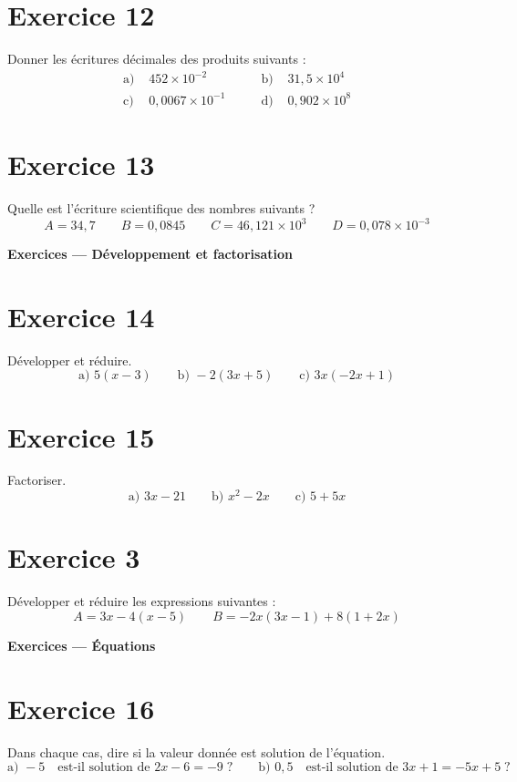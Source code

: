 \documentclass[a4paper,11pt]{article}
\begin{document}
\section*{Exercice 12}
Donner les écritures décimales des produits suivants :
\[
\begin{aligned}
\text{a) }& 452\times 10^{-2}
&\qquad \text{b) }& 31{,}5\times 10^{4}\\[4pt]
\text{c) }& 0{,}0067\times 10^{-1}
&\qquad \text{d) }& 0{,}902\times 10^{8}
\end{aligned}
\]


\section*{Exercice 13}
Quelle est l’écriture scientifique des nombres suivants ?
\[
A=34{,}7 
\qquad B=0{,}0845
\qquad C=46{,}121\times 10^{3}
\qquad D=0{,}078\times 10^{-3}
\]

\bigskip
{\Large \textbf{Exercices — Développement et factorisation}}\par\medskip

\section*{Exercice 14}
Développer et réduire.
\[
\text{a) } 5(x-3)
\qquad \text{b) } -2(3x+5)
\qquad \text{c) } 3x(-2x+1)
\]


\section*{Exercice 15}
Factoriser.
\[
\text{a) } 3x-21
\qquad \text{b) } x^{2}-2x
\qquad \text{c) } 5+5x
\]


\section*{Exercice 3}
Développer et réduire les expressions suivantes :
\[
A=3x-4(x-5)
\qquad
B=-2x(3x-1)+8(1+2x)
\]

\bigskip
{\Large \textbf{Exercices — Équations}}\par\medskip

\section*{Exercice 16}
Dans chaque cas, dire si la valeur donnée est solution de l’équation.
\[
\text{a) } -5 \quad \text{est-il solution de } 2x-6=-9\;?
\qquad
\text{b) } 0{,}5 \quad \text{est-il solution de } 3x+1=-5x+5\;?
\]
\end{document}
